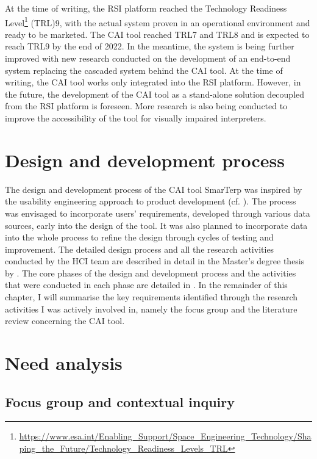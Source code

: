 At the time of writing, the RSI platform reached the Technology Readiness Level\footnote{\url{https://www.esa.int/Enabling\_Support/Space\_Engineering\_Technology/Shaping\_the\_Future/Technology\_Readiness\_Levels\_TRL}} (TRL)9, with the actual system proven in an operational environment and ready to be marketed. The CAI tool reached TRL7 and TRL8 and is expected to reach TRL9 by the end of 2022. In the meantime, the system is being further improved with new research conducted on the development of an end-to-end system replacing the cascaded system behind the CAI tool. At the time of writing, the CAI tool works only integrated into the RSI platform. However, in the future, the development of the CAI tool as a stand-alone solution decoupled from the RSI platform is foreseen. More research is also being conducted to improve the accessibility of the tool for visually impaired interpreters.


\section{Design and development process}


The design and development process of the CAI tool SmarTerp was inspired by the usability engineering approach to product development (cf. ). The process was envisaged to incorporate users’ requirements, developed through various data sources, early into the design of the tool. It was also planned to incorporate data into the whole process to refine the design through cycles of testing and improvement. The detailed design process and all the research activities conducted by the HCI team are described in detail in the Master’s degree thesis by \citet{fossati2021smarterp}. The core phases of the design and development process and the activities that were conducted in each phase are detailed in \citet{fossati2021smarterp}. In the remainder of this chapter, I will summarise the key requirements identified through the research activities I was actively involved in, namely the focus group and the literature review concerning the CAI tool.


\section{Need analysis}


\subsection{Focus group and contextual inquiry}

